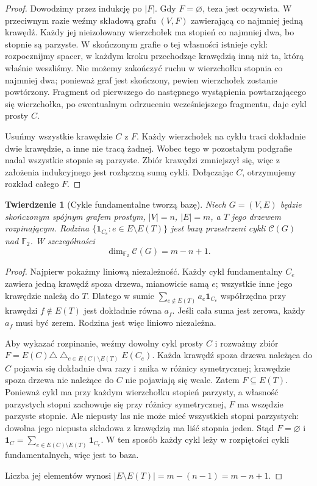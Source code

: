 \documentclass[11pt,a4paper]{report}
\numberwithin{equation}{section}
\theoremstyle{plain}
\newtheorem{twierdzenie}{Twierdzenie}[section]
\theoremstyle{definition}
\theoremstyle{remark}
\begin{document}
\begin{proof}
Dowodzimy przez indukcję po $|F|$. Gdy $F=\varnothing$,
teza jest oczywista. W przeciwnym razie
weźmy składową grafu $(V,F)$ zawierającą
co najmniej jedną krawędź. Każdy jej
nieizolowany wierzchołek ma stopień co najmniej
dwa, bo stopnie są parzyste. W skończonym
grafie o tej własności istnieje cykl:
rozpocznijmy spacer, w każdym kroku przechodząc
krawędzią inną niż ta, którą właśnie weszliśmy.
Nie możemy zakończyć ruchu w wierzchołku
stopnia co najmniej dwa; ponieważ graf jest
skończony, pewien wierzchołek zostanie
powtórzony. Fragment od pierwszego do
następnego wystąpienia powtarzającego się
wierzchołka, po ewentualnym odrzuceniu
wcześniejszego fragmentu, daje cykl prosty $C$.

Usuńmy wszystkie krawędzie $C$ z $F$.
Każdy wierzchołek na cyklu traci dokładnie
dwie krawędzie, a inne nie tracą żadnej.
Wobec tego w pozostałym podgrafie nadal
wszystkie stopnie są parzyste. Zbiór
krawędzi zmniejszył się, więc z założenia
indukcyjnego jest rozłączną sumą cykli.
Dołączając $C$, otrzymujemy rozkład całego $F$.
\end{proof}

\begin{twierdzenie}[Cykle fundamentalne tworzą bazę]
Niech $G=(V,E)$ będzie skończonym spójnym
grafem prostym, $|V|=n$, $|E|=m$,
a $T$ jego drzewem rozpinającym. Rodzina
$\{\mathbf1_{C_e}:e\in E\setminus E(T)\}$
jest bazą przestrzeni cykli $\mathcal C(G)$
nad $\mathbb F_2$. W szczególności
\[
\dim_{\mathbb F_2}\mathcal C(G)=m-n+1.
\]
\end{twierdzenie}

\begin{proof}
Najpierw pokażmy liniową niezależność.
Każdy cykl fundamentalny $C_e$ zawiera
jedną krawędź spoza drzewa, mianowicie
samą $e$; wszystkie inne jego krawędzie
należą do $T$. Dlatego w sumie
$\sum_{e\notin E(T)}a_e\mathbf1_{C_e}$
współrzędna przy krawędzi $f\notin E(T)$
jest dokładnie równa $a_f$. Jeśli cała
suma jest zerowa, każdy $a_f$ musi być
zerem. Rodzina jest więc liniowo niezależna.

Aby wykazać rozpinanie, weźmy dowolny
cykl prosty $C$ i rozważmy zbiór
$F=E(C)\triangle\bigtriangleup_{e\in E(C)\setminus E(T)} E(C_e)$.
Każda krawędź spoza drzewa należąca do $C$
pojawia się dokładnie dwa razy i znika w
różnicy symetrycznej; krawędzie spoza
drzewa nie należące do $C$ nie pojawiają się
wcale. Zatem $F\subseteq E(T)$.
Ponieważ cykl ma przy każdym wierzchołku
stopień parzysty, a własność parzystych
stopni zachowuje się przy różnicy symetrycznej,
$F$ ma wszędzie parzyste stopnie.
Ale niepusty las nie może mieć wszystkich
stopni parzystych: dowolna jego niepusta
składowa z krawędzią ma liść stopnia jeden.
Stąd $F=\varnothing$ i
$\mathbf1_C=\sum_{e\in E(C)\setminus E(T)}\mathbf1_{C_e}$.
W ten sposób każdy cykl leży w rozpiętości
cykli fundamentalnych, więc jest to baza.

Liczba jej elementów wynosi
$|E\setminus E(T)|=m-(n-1)=m-n+1$.
\end{proof}
\end{document}
